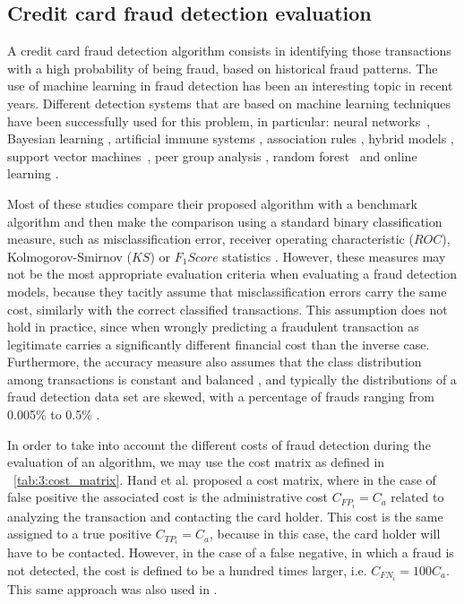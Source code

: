   
\subsection{Credit card fraud detection evaluation}
\label{sec:4:frad:eval}

  A credit card fraud detection algorithm consists in identifying those transactions with a 
  high probability of being fraud, based on historical fraud patterns. The use of machine learning 
  in fraud detection has been an interesting topic in recent years. Different detection systems 
  that are based on machine learning  techniques have been successfully   used for this problem, in 
  particular: neural networks~\citep{Maes2002}, Bayesian learning \citep{Maes2002}, artificial 
  immune systems \citep{Gadi2008}, association rules \citep{Sanchez2009}, hybrid models 
  \citep{Krivko2010}, support vector machines~\citep{Bhattacharyya2011}, peer group  analysis 
  \citep{Weston2008}, random forest~\citep{CorreaBahnsen2013} and online learning 
  \citep{DalPozzolo2014}.
 
  Most of these studies compare their proposed algorithm with a benchmark algorithm and then make 
  the comparison using a standard binary classification measure, such as misclassification error, 
  receiver operating characteristic ($ROC$), Kolmogorov-Smirnov ($KS$) or \mbox{$F_1Score$} 
  statistics \citep{Bolton2002,Hand2007a,DalPozzolo2014}. 
  However, these measures may not be the most appropriate evaluation criteria when  evaluating a 
  fraud detection models, because they tacitly assume that misclassification errors carry the same 
  cost, similarly with the correct classified transactions. This assumption does not hold in 
  practice, since  when wrongly predicting a fraudulent transaction as legitimate carries a 
  significantly different financial cost than the inverse case. Furthermore, the accuracy measure 
  also assumes that the class distribution among transactions is constant and balanced 
  \citep{Provost1998}, and typically the distributions of a fraud detection data set are skewed, 
  with a percentage of frauds ranging from 0.005\% to 0.5\% \citep{Gadi2008,Bhattacharyya2011}.
  
	In order to take into account the different costs of fraud detection during the evaluation of an 
	algorithm, we may use the cost matrix as defined in \tablename{~\ref{tab:3:cost_matrix}}.
  Hand et al. \citep{Hand2007a} proposed a cost matrix, where in the case of false positive the 
  associated  cost is the administrative cost $C_{FP_i}=C_a$ related to analyzing the transaction 
  and contacting  the card holder. This cost is the same assigned to a true positive 
  $C_{TP_i}=C_a$, because in  this case,  the card holder will have to be contacted. However, in 
  the case of a false negative, in which a  fraud is  not detected, the cost is defined to be a 
  hundred times larger, i.e. $C_{FN_i}=100C_a$. This same approach was also used in 
  \citep{Gadi2008}.

